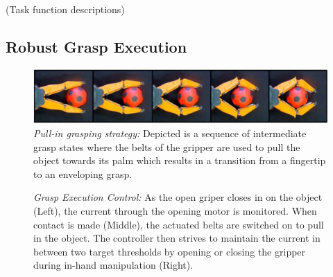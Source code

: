 \cite{Kano09}(Task function descriptions)
%
\subsection{Robust Grasp Execution}
\label{subsec:grasp_execution}
%
\begin{figure}[!t]
 \centering
   \includegraphics[width = 1.0\linewidth]{figs/pull_in}
   \caption{\textit{Pull-in grasping strategy:} Depicted is a sequence of intermediate grasp states
     where the belts of the gripper are used to pull the object towards its palm which results in a
     transition from a fingertip to an enveloping grasp.}
   \vspace{-4mm}
   \label{fig:pull_in}
   \centering
 \end{figure}
%
\begin{figure}[!t]
 \centering
   \caption{\textit{Grasp Execution Control:} As the open griper closes in on the object (Left), the
     current through the opening motor is monitored. When contact is made (Middle), the actuated
     belts are switched on to pull in the object. The controller then strives to maintain the
     current in between two target thresholds by opening or closing the gripper during in-hand
     manipulation (Right).}
   \label{fig:pull_in_control}
 \centering
\end{figure}
